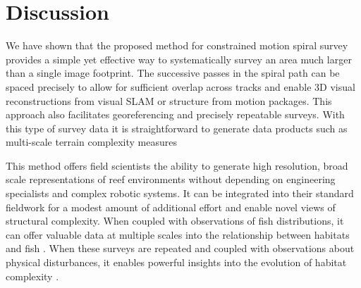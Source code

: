 \section{Discussion}
We have shown that the proposed method for constrained motion spiral survey provides a simple yet effective way to systematically survey an area much larger than a single image footprint. The successive passes in the spiral path can be spaced precisely to allow for sufficient overlap across tracks and enable 3D visual reconstructions from visual SLAM or structure from motion packages. This approach also facilitates georeferencing and precisely repeatable surveys. With this type of survey data it is straightforward to generate data products such as multi-scale terrain complexity measures \cite{Friedman_2012}

This method offers field scientists the ability to generate high resolution, broad scale representations of reef environments without depending on engineering specialists and complex robotic systems. It can be integrated into their standard fieldwork for a modest amount of additional effort and enable novel views of structural complexity. When coupled with observations of fish distributions, it can offer valuable data at multiple scales into the relationship between habitats and fish \cite{josh_something_here}. When these surveys are repeated and coupled with observations about physical disturbances, it enables powerful insights into the evolution of habitat complexity \cite{josh_something_here}.

